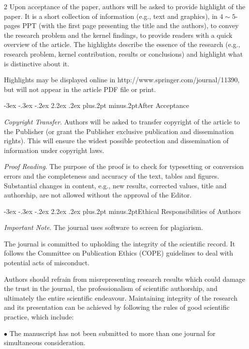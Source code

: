 \documentclass[twoside]{article}
\makeatletter
\def\section{\@startsection{section}{1}{\z@}%
 {-3ex \@plus -.3ex \@minus -.2ex}%
 {2.2ex \@plus.2ex}%
{\normalfont\normalsize\protect\baselineskip=14.5pt plus.2pt minus.2pt\bfseries}}
\makeatother
\begin{document}
\begin{multicols}{2}
Upon acceptance of the paper, authors will be asked to provide highlight of the paper. It is a short collection of information (e.g., text and graphics), in $4\sim 5$-pages PPT (with the first page presenting the title and the authors), to convey the research problem and the kernel findings, to provide readers with a quick overview of the article. The highlights describe the essence of the research (e.g., research problem, kernel contribution, results or conclusions) and highlight what is distinctive about it.

Highlights may be displayed online in http://www.springer.com/journal/11390, but will not appear in the article PDF file or print.

\section{After Acceptance}

{\it Copyright Transfer}. Authors will be asked to transfer copyright of the article to the Publisher (or grant the Publisher exclusive publication and dissemination rights). This will ensure the widest possible protection and dissemination of information under copyright laws.

{\it Proof Reading}. The purpose of the proof is to check for typesetting or conversion errors and the completeness and accuracy of the text, tables and figures. Substantial changes in content, e.g., new results, corrected values, title and authorship, are not allowed without the approval of the Editor.

\section{Ethical Responsibilities of Authors}

{\it Important Note}. The journal uses software to screen for plagiarism.

The journal is committed to upholding the integrity of the scientific record. It follows the Committee on Publication Ethics (COPE) guidelines to deal with potential acts of misconduct.

Authors should refrain from misrepresenting research results which could damage the trust in the journal, the professionalism of scientific authorship, and ultimately the entire scientific endeavour. Maintaining integrity of the research and its presentation can be achieved by following the rules of good scientific practice, which include:

$\bullet$ The manuscript has not been submitted to more than one journal for simultaneous consideration.


\end{multicols}
\end{document}
